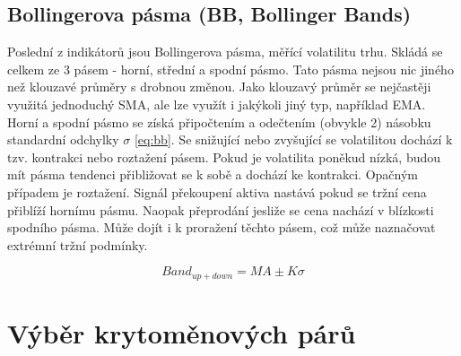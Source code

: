 \subsection{Bollingerova pásma (BB, Bollinger Bands)}
Poslední z indikátorů jsou Bollingerova pásma, měřící volatilitu trhu. Skládá se celkem ze 3 pásem - horní, střední a spodní pásmo. Tato pásma nejsou nic jiného než klouzavé průměry
s drobnou změnou. Jako klouzavý průměr se nejčastěji využitá jednoduchý SMA, ale lze využít i jakýkoli jiný typ, například EMA. Horní a spodní pásmo se získá připočtením a odečtením
(obvykle 2) násobku standardní odchylky $\sigma$ \ref{eq:bb}. Se snižující nebo zvyšující se volatilitou dochází k tzv. kontrakci nebo roztažení pásem. Pokud je volatilita poněkud nízká, budou mít
pásma tendenci přibližovat se k sobě a dochází ke kontrakci. Opačným případem je roztažení. Signál překoupení aktiva nastává pokud se tržní cena přiblíží hornímu pásmu. Naopak přeprodání
jesliže se cena nachází v blízkosti spodního pásma. Může dojít i k proražení těchto pásem, což může naznačovat extrémní tržní podmínky.

\begin{equation}
    Band_{up + down} = MA \pm K\sigma
    \label{eq:bb}
\end{equation}

\section{Výběr krytoměnových párů}
\label{sec:ChoosingCryptopairs}

\endinput